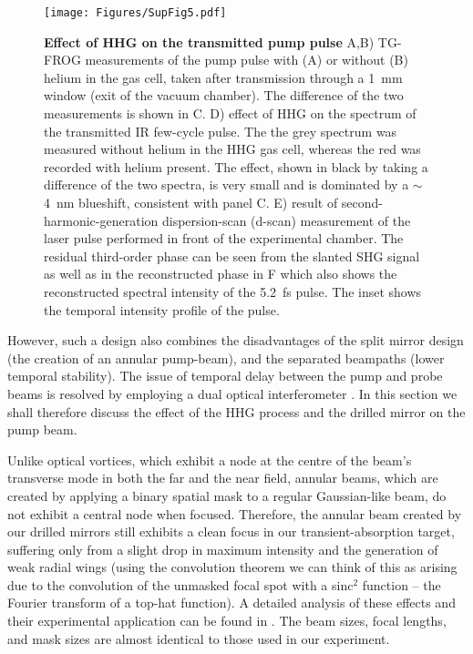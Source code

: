 \documentclass[12pt]{article}
\begin{document}
\begin{figure}
    \centering
    \texttt{[image: Figures/SupFig5.pdf]}
    \caption{\textbf{Effect of HHG on the transmitted pump pulse}  A,B) TG-FROG measurements of the pump pulse with (A) or without (B) helium in the gas cell, taken after transmission through a 1~mm window (exit of the vacuum chamber). The difference of the two measurements is shown in C. D) effect of HHG on the spectrum of the transmitted IR few-cycle pulse. The the grey spectrum was measured without helium in the HHG gas cell, whereas the red was recorded with helium present. The effect, shown in black by taking a difference of the two spectra, is very small and is dominated by a $\sim$4~nm blueshift, consistent with panel C. E) result of second-harmonic-generation dispersion-scan (d-scan) measurement of the laser pulse performed in front of the experimental chamber. The residual third-order phase can be seen from the slanted SHG signal as well as in the reconstructed phase in F which also shows the reconstructed spectral intensity of the 5.2~fs pulse. The inset shows the temporal intensity profile of the pulse.}
    \label{fig:FROG}
\end{figure}

However, such a design also combines the disadvantages of the split mirror design (the creation of an annular pump-beam), and the separated beampaths (lower temporal stability). The issue of temporal delay between the pump and probe beams is resolved by employing a dual optical interferometer \cite{Huppert2015}. In this section we shall therefore discuss the effect of the HHG process and the drilled mirror on the pump beam. 

Unlike optical vortices, which exhibit a node at the centre of the beam's transverse mode in both the far and the near field, annular beams, which are created by applying a binary spatial mask to a regular Gaussian-like beam, do not exhibit a central node when focused. Therefore, the annular beam created by our drilled mirrors still exhibits a clean focus in our transient-absorption target, suffering only from a slight drop in maximum intensity and the generation of weak radial wings (using the convolution theorem we can think of this as arising due to the convolution of the unmasked focal spot with a sinc$^2$ function -- the Fourier transform of a top-hat function). A detailed analysis of these effects and their experimental application can be found in \cite{Gaumnitz2018}. The beam sizes, focal lengths, and mask sizes are almost identical to those used in our experiment.
\end{document}
